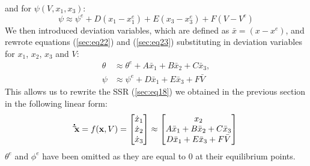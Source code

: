 \documentclass[a4paper,10pt,reqno]{amsart}
\numberwithin{equation}{section}
\begin{document}
and for $\psi(V, x_1, x_3)$:
\begin{equation}
\label{sec:eq23}
    \psi \approx \psi^{e} + D(x_1-x_1^e) + E(x_3-x_3^e) + F(V-V^e)
\end{equation}
We then introduced deviation variables, which are defined as $\bar x=(x-x^e)$, and rewrote equations (\ref{sec:eq22}) and (\ref{sec:eq23}) substituting in deviation variables for $x_1$, $x_2$, $x_3$ and $V$:
\begin{align}
\label{sec:eq24}
    \theta &\approx \theta^e + A\bar x_1 + B\bar x_2 + C\bar x_3, \\
    \psi &\approx \psi^e + D\bar x_1 + E\bar x_3 + F\bar V
\end{align}
This allows us to rewrite the SSR (\ref{sec:eq18}) we obtained in the previous section in the following linear form:
\begin{equation}
\label{sec:eq24}
    \bold{\dot \bar{x}} = f(\bold x, V) = \begin{bmatrix} 
        \dot x_1 \\ 
        \dot x_2 \\ 
        \dot x_3 
    \end{bmatrix} \approx \begin{bmatrix}
        x_2 \\
        A\bar x_1 + B\bar x_2 + C\bar x_3 \\
        D\bar x_1 + E\bar x_3 + F\bar V
    \end{bmatrix}
\end{equation}
$\theta^e$ and $\phi^e$ have been omitted as they are equal to 0 at their equilibrium points.
\end{document}
